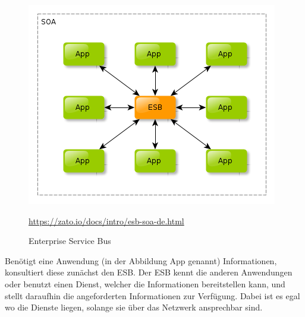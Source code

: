 \begin{figure}[htb]
    \centering 
    \includegraphics[width=\linewidth]{content/images/esb-ok}\
    \caption[ESB]{Enterprise Service Bus}
    \quelle\url{https://zato.io/docs/intro/esb-soa-de.html}
    \label{fig:esb}  
\end{figure}
\newpage
Benötigt eine Anwendung (in der Abbildung App genannt) Informationen, konsultiert diese zunächst den ESB. Der ESB kennt die anderen Anwendungen oder benutzt einen Dienst, welcher die Informationen bereitstellen kann, und stellt daraufhin die angeforderten Informationen zur Verfügung. Dabei ist es egal wo die Dienste liegen, solange sie über das Netzwerk ansprechbar sind.